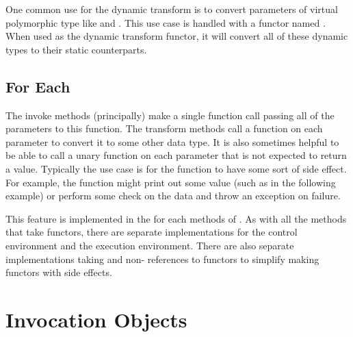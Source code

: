 One common use for the  dynamic transform
is to convert parameters of virtual polymorphic type like
 and . This
use case is handled with a functor named
. When used as the dynamic transform
functor, it will convert all of these dynamic types to their static
counterparts.



\subsection{For Each}
\label{sec:FunctionInterface:ForEach}


The invoke methods (principally) make a single function call passing all of
the parameters to this function. The transform methods call a function on
each parameter to convert it to some other data type. It is also sometimes
helpful to be able to call a unary function on each parameter that is not
expected to return a value. Typically the use case is for the function to
have some sort of side effect. For example, the function might print out
some value (such as in the following example) or perform some check on the
data and throw an exception on failure.

This feature is implemented in the for each methods of
.  As with all the
 methods that take functors, there are
separate implementations for the control environment and the execution
environment. There are also separate implementations taking
 and non- references to functors to
simplify making functors with side effects.





\section{Invocation Objects}
\label{sec:InvocationObjects}


